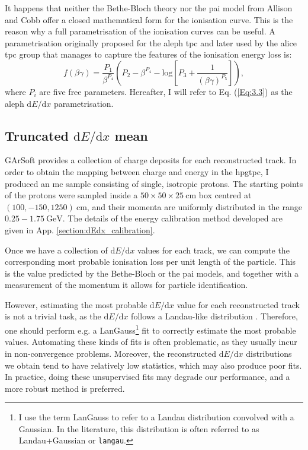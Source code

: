 It happens that neither the Bethe-Bloch theory nor the \gls{pai} model from Allison and Cobb offer a closed mathematical form for the ionisation curve. This is the reason why a full parametrisation of the ionisation curves can be useful. A parametrisation originally proposed for the \gls{aleph} \gls{tpc} \cite{Blum2008} and later used by the \gls{alice} \gls{tpc} \cite{ALICETPC2013} group that manages to capture the features of the ionisation energy loss is:
\begin{equation}\label{Eq:3.3}
    f(\beta\gamma) = \frac{P_{1}}{\beta^{P_{4}}}\left(P_{2}-\beta^{P_{4}}-\mathrm{log}\left[P_{3}+\frac{1}{(\beta\gamma)^{P_{5}}}\right]\right),
\end{equation}
where $P_{i}$ are five free parameters. Hereafter, I will refer to Eq. (\ref{Eq:3.3}) as the \gls{aleph} $\mathrm{d}E/\mathrm{d}x$ parametrisation.

\subsection[Truncated \texorpdfstring{$\mathrm{d}E/\mathrm{d}x$}{dE/dx} mean]{Truncated \boldmath\texorpdfstring{$\mathrm{d}E/\mathrm{d}x$}{dE/dx} mean} \label{subsec:mean_dEdx}

GArSoft provides a collection of charge deposits for each reconstructed track. In order to obtain the mapping between charge and energy in the \gls{hpgtpc}, I produced an \gls{mc} sample consisting of single, isotropic protons. The starting points of the protons were sampled inside a $50\times50\times25 \ \mathrm{cm}$ box centred at $(100, -150, 1250)~\mathrm{cm}$, and their momenta are uniformly distributed in the range $0.25 - 1.75 ~ \mathrm{GeV}$. The details of the energy calibration method developed are given in App. \ref{section:dEdx_calibration}.

Once we have a collection of $\mathrm{d}E/\mathrm{d}x$ values for each track, we can compute the corresponding most probable ionisation loss per unit length of the particle. This is the value predicted by the Bethe-Bloch or the \gls{pai} models, and together with a measurement of the momentum it allows for particle identification.

However, estimating the most probable $\mathrm{d}E/\mathrm{d}x$ value for each reconstructed track is not a trivial task, as the $\mathrm{d}E/\mathrm{d}x$ follows a Landau-like distribution \cite{Landau1944}. Therefore, one should perform e.g. a LanGauss\footnote{I use the term LanGauss to refer to a Landau distribution convolved with a Gaussian. In the literature, this distribution is often referred to as Landau+Gaussian or \texttt{langau}.} fit to correctly estimate the most probable values. Automating these kinds of fits is often problematic, as they usually incur in non-convergence problems. Moreover, the reconstructed $\mathrm{d}E/\mathrm{d}x$ distributions we obtain tend to have relatively low statistics, which may also produce poor fits. In practice, doing these unsupervised fits may degrade our performance, and a more robust method is preferred.

